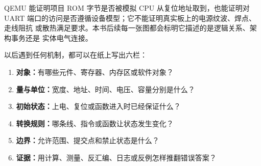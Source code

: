 QEMU 能证明项目 ROM 字节是否被模拟 CPU 从复位地址取到，也能证明对 UART
端口的访问是否遵循设备模型；它不能证明真实板上的电源纹波、焊点、走线阻抗
或散热满足要求。本书后续每一张图都会标明它描述的是逻辑关系、架构事务还是
实体电气连接。

以后遇到任何机制，都可以在纸上写出六栏：

\begin{enumerate}[leftmargin=2.2em]
  \item \textbf{对象：}有哪些元件、寄存器、内存区或软件对象？
  \item \textbf{量与单位：}宽度、地址、时间、电压、容量分别是什么？
  \item \textbf{初始状态：}上电、复位或函数进入时已经保证什么？
  \item \textbf{转换规则：}哪条线、指令或函数让状态发生变化？
  \item \textbf{边界：}允许范围、提交点和禁止状态是什么？
  \item \textbf{证据：}用计算、测量、反汇编、日志或反例怎样推翻错误答案？
\end{enumerate}


